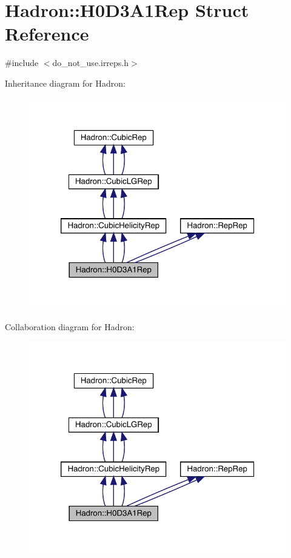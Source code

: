 \hypertarget{structHadron_1_1H0D3A1Rep}{}\section{Hadron\+:\+:H0\+D3\+A1\+Rep Struct Reference}
\label{structHadron_1_1H0D3A1Rep}


{\ttfamily \#include $<$do\+\_\+not\+\_\+use.\+irreps.\+h$>$}



Inheritance diagram for Hadron\+:
\nopagebreak
\begin{figure}[H]
\begin{center}
\leavevmode
\includegraphics[width=320pt]{da/d99/structHadron_1_1H0D3A1Rep__inherit__graph}
\end{center}
\end{figure}


Collaboration diagram for Hadron\+:
\nopagebreak
\begin{figure}[H]
\begin{center}
\leavevmode
\includegraphics[width=320pt]{dd/d21/structHadron_1_1H0D3A1Rep__coll__graph}
\end{center}
\end{figure}
